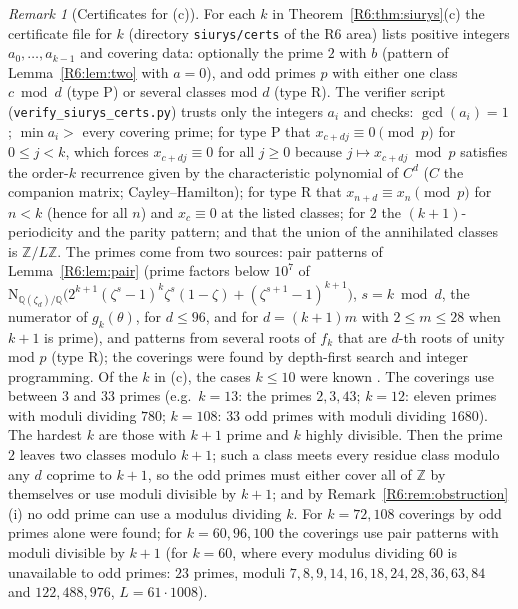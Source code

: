 \documentclass[11pt]{amsart}
\theoremstyle{definition}
\theoremstyle{remark}
\newtheorem{remark}[theorem]{Remark}
\providecommand{\Q}{\mathbb Q}
\providecommand{\Z}{\mathbb Z}
\begin{document}
\begin{remark}[Certificates for (c)]\label{R6:rem:certs}
For each $k$ in Theorem~\ref{R6:thm:siurys}(c) the certificate file for $k$ (directory
\texttt{siurys/certs} of the R6 area) lists positive integers $a_0,\dots,a_{k-1}$ and covering data: optionally the prime $2$ with $b$ (pattern of Lemma~\ref{R6:lem:two} with $a=0$), and
odd primes $p$ with either one class $c\bmod d$ (type P) or several classes mod $d$
(type R). The verifier script (\texttt{verify\_\allowbreak{}siurys\_\allowbreak{}certs.py}) trusts only the integers
$a_i$ and checks:
$\gcd(a_i)=1$; $\min a_i>$ every covering prime; for type P that $x_{c+dj}\equiv0\pmod p$ for
$0\le j<k$, which forces $x_{c+dj}\equiv0$ for all $j\ge0$ because $j\mapsto x_{c+dj}\bmod p$ satisfies
the order-$k$ recurrence given by the characteristic polynomial of $C^d$ ($C$ the companion matrix;
Cayley--Hamilton); for type R that $x_{n+d}\equiv x_n\pmod p$ for $n<k$ (hence for all $n$) and
$x_c\equiv0$ at the listed classes; for $2$ the $(k+1)$-periodicity and the parity pattern; and that the
union of the annihilated classes is $\Z/L\Z$. The primes come from two sources: pair patterns of
Lemma~\ref{R6:lem:pair} (prime factors below $10^7$ of
$\mathrm{N}_{\Q(\zeta_d)/\Q}\bigl(2^{k+1}(\zeta^s-1)^k\zeta^s(1-\zeta)+(\zeta^{s+1}-1)^{k+1}\bigr)$,
$s=k\bmod d$, the numerator of $g_k(\theta)$, for $d\le96$, and for $d=(k+1)m$ with $2\le m\le28$ when
$k+1$ is prime), and patterns from several roots of $f_k$ that are $d$-th roots of unity mod $p$
(type R); the coverings were found by depth-first search and integer programming. Of the $k$ in (c),
the cases $k\le10$ were known \cite{R6-Siurys}. The coverings use between $3$ and $33$ primes
(e.g.\ $k=13$: the primes $2,3,43$; $k=12$: eleven primes with moduli dividing $780$; $k=108$:
$33$ odd primes with moduli dividing $1680$). The hardest $k$ are those with $k+1$ prime and $k$
highly divisible. Then the prime $2$ leaves two classes modulo $k+1$; such a class meets every
residue class modulo any $d$ coprime to $k+1$, so the odd primes must either cover all of $\Z$ by
themselves or use moduli divisible by $k+1$; and by Remark~\ref{R6:rem:obstruction}(i) no odd prime
can use a modulus dividing $k$. For $k=72,108$ coverings by odd primes alone were found; for
$k=60,96,100$ the coverings use pair patterns with moduli divisible by $k+1$ (for $k=60$, where
every modulus dividing $60$ is unavailable to odd primes: $23$ primes, moduli $7,8,9,14,16,18,24,28,
36,63,84$ and $122,488,976$, $L=61\cdot1008$).
\end{remark}
\end{document}
